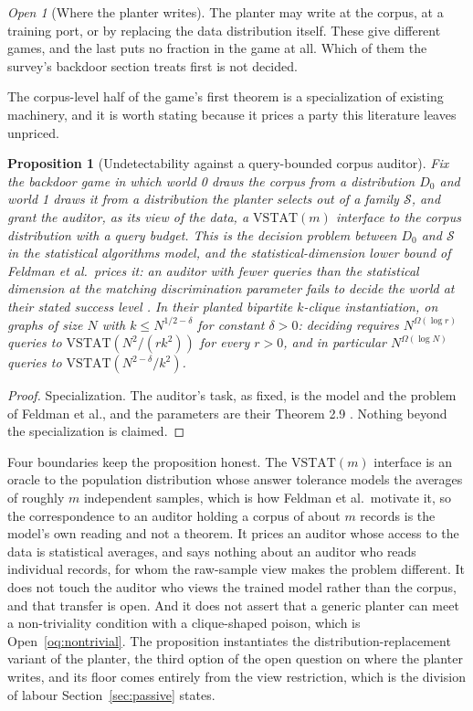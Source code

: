 \documentclass[11pt]{article}
\theoremstyle{definition}
\theoremstyle{plain}
\newtheorem{proposition}{Proposition}
\theoremstyle{remark}
\newtheorem{openq}{Open}
\begin{document}
\begin{openq}[Where the planter writes]
The planter may write at the corpus, at a training port, or by replacing the data
distribution itself. These give different games, and the last puts no fraction
in the game at all. Which of them the survey's backdoor section treats first is not
decided.
\end{openq}

The corpus-level half of the game's first theorem is a specialization of
existing machinery, and it is worth stating because it prices a party this
literature leaves unpriced.

\begin{proposition}[Undetectability against a query-bounded corpus auditor]
\label{prop:sda}
Fix the backdoor game in which world 0 draws the corpus from a distribution
$D_0$ and world 1 draws it from a distribution the planter selects out of a
family $\mathcal{S}$, and grant the auditor, as its view of the data, a
$\mathrm{VSTAT}(m)$ interface to the corpus distribution with a query budget.
This is the decision problem between $D_0$ and $\mathcal{S}$ in the statistical
algorithms model, and the statistical-dimension lower bound of Feldman et al.\
prices it: an auditor with fewer queries than the statistical dimension at the
matching discrimination parameter fails to decide the world at their stated
success level \cite{FGRVX17}. In their planted bipartite $k$-clique
instantiation, on graphs of size $N$ with $k \le N^{1/2-\delta}$ for constant
$\delta > 0$: deciding requires $N^{\Omega(\log r)}$ queries to
$\mathrm{VSTAT}(N^2/(r k^2))$ for every $r > 0$, and in particular
$N^{\Omega(\log N)}$ queries to $\mathrm{VSTAT}(N^{2-\delta}/k^2)$.
\end{proposition}

\begin{proof}
Specialization. The auditor's task, as fixed, is the model and the problem of
Feldman et al., and the parameters are their Theorem 2.9 \cite{FGRVX17}. Nothing
beyond the specialization is claimed.
\end{proof}

Four boundaries keep the proposition honest. The $\mathrm{VSTAT}(m)$ interface
is an oracle to the population distribution whose answer tolerance models the
averages of roughly $m$ independent samples, which is how Feldman et al.\
motivate it, so the correspondence to an auditor holding a corpus of about $m$
records is the model's own reading and not a theorem. It prices an auditor whose
access to the data is statistical averages, and says nothing about an auditor
who reads individual records, for whom the raw-sample view makes the problem
different. It does not touch the auditor who views the trained model rather than
the corpus, and that transfer is open. And it does not assert that a generic
planter can meet a non-triviality condition with a clique-shaped poison, which
is Open~\ref{oq:nontrivial}. The proposition instantiates the
distribution-replacement variant of the planter, the third option of the open
question on where the planter writes, and its floor comes entirely from the view
restriction, which is the division of labour Section~\ref{sec:passive} states.
\end{document}
